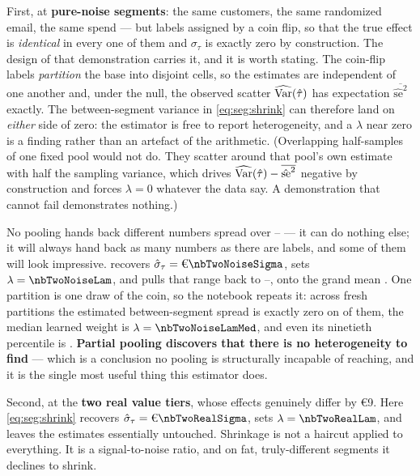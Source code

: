 First, at \nbTwoNNoise{} \textbf{pure-noise segments}: the same customers, the same randomized
email, the same spend --- but labels assigned by a coin flip, so that the true effect is
\emph{identical} in every one of them and $\sigma_\tau$ is exactly zero by construction. The design
of that demonstration carries it, and it is worth stating. The coin-flip labels \emph{partition} the
base into \nbTwoNNoise{} disjoint cells, so the \nbTwoNNoise{} estimates are independent of one
another and, under the null, the observed scatter $\widehat{\operatorname{Var}}(\hat\tau)$ has expectation
$\overline{\hat{\mathrm{se}}^2}$ exactly. The between-segment variance in \cref{eq:seg:shrink} can
therefore land on \emph{either} side of zero: the estimator is free to report heterogeneity, and a
$\lambda$ near zero is a finding rather than an artefact of the arithmetic. (Overlapping
half-samples of one fixed pool would not do. They scatter around that pool's own estimate with half
the sampling variance, which drives $\widehat{\operatorname{Var}}(\hat\tau) - \overline{\hat{\mathrm{se}}^2}$
negative by construction and forces $\lambda = 0$ whatever the data say. A demonstration that cannot
fail demonstrates nothing.)

No pooling hands back \nbTwoNNoise{} different numbers spread over
\eur{\nbTwoNoiseRawLo}--\eur{\nbTwoNoiseRawHi} --- it can do nothing else; it will always hand back
as many numbers as there are labels, and some of them will look impressive. 
recovers $\hat\sigma_\tau = \eur{\nbTwoNoiseSigma}$, sets $\lambda = \nbTwoNoiseLam$, and pulls that
range back to \eur{\nbTwoNoiseShrunkLo}--\eur{\nbTwoNoiseShrunkHi}, onto the grand mean
\eur{\nbTwoNoiseGrand}. One partition is one draw of the coin, so the notebook repeats it:
across \nbTwoNoiseReps{} fresh partitions the estimated between-segment spread is exactly zero on
\pc{\nbTwoNoiseZeroPct} of them, the median learned weight is $\lambda = \nbTwoNoiseLamMed$, and even
its ninetieth percentile is \nbTwoNoiseLamHi. \textbf{Partial pooling discovers that there is no
heterogeneity to find} --- which is a conclusion no pooling is structurally incapable of reaching,
and it is the single most useful thing this estimator does.

Second, at the \textbf{two real value tiers}, whose effects genuinely differ by €9. Here
\cref{eq:seg:shrink} recovers $\hat\sigma_\tau = \eur{\nbTwoRealSigma}$, sets
$\lambda = \nbTwoRealLam$, and leaves the estimates essentially untouched. Shrinkage is not a
haircut applied to everything. It is a signal-to-noise ratio, and on fat, truly-different segments
it declines to shrink.

